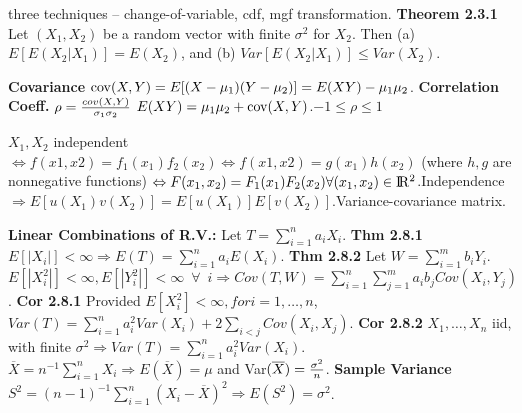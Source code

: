 {{}%
%
%
%
%
%
three techniques -- change-of-variable, cdf, mgf transformation.
%
%
{\bf Theorem 2.3.1} Let $(X_1,X_2)$ be a random vector with finite $\sigma^2$ for $X_2$. Then (a) $E[E(X_2|X_1)]=E(X_2)$, and (b) $Var[E(X_2|X_1)] \leq Var(X_2)$.\quad

{\bf Covariance} ${\rm cov}(X,Y) = E[(X-\mu_1)(Y-\mu_2)] = E(XY) - \mu_1\mu_2$.\quad
{\bf Correlation Coeff.} $\rho = {cov(X,Y)\over \sigma_1\sigma_2}$\quad
$E(XY) = \mu_1\mu_2 + {\rm cov}(X,Y)$.\quad $-1 \leq \rho \leq 1$

$X_1,X_2$ independent $\Leftrightarrow f(x1,x2) = f_1(x_1)f_2(x_2) \Leftrightarrow f(x1,x2) = g(x_1)h(x_2)$ (where $h,g$ are nonnegative functions) $\Leftrightarrow F(x_1,x_2)=F_1(x_1)F_2(x_2) \forall (x_1,x_2) \in \rm I\!R^2$.\quad Independence $\Rightarrow E[u(X_1)v(X_2)] = E[u(X_1)]E[v(X_2)]$.\quad Variance-covariance matrix.

{\bf Linear Combinations of R.V.:} Let $T = \sum_{i=1}^na_iX_i$. {\bf Thm 2.8.1}  $E[|X_i|] < \infty \Longrightarrow E(T) = \sum_{i=1}^na_iE(X_i)$.%
{\bf Thm 2.8.2} Let $W = \sum_{i=1}^mb_iY_i$. $E[|X_i^2|] < \infty, E[|Y_i^2|] < \infty\enspace \forall\enspace i \Longrightarrow Cov(T,W) = \sum_{i=1}^n\sum_{j=1}^ma_ib_jCov(X_i,Y_j)$.
{\bf Cor 2.8.1} Provided $E[X_i^2] < \infty, for i = 1,\dots,n$, $Var(T)=\sum_{i=1}^n{a_i^2Var(X_i)+2\sum_{i<j}Cov(X_i,X_j)}$.\quad
{\bf Cor 2.8.2} $X_1,\dots,X_n$ iid, with finite $\sigma^2 \Longrightarrow Var(T) = \sum_{i=1}^na_i^2Var(X_i)$.\quad
${\overline X} = n^{-1}\sum_{i=1}^nX_i \Rightarrow E(\overline X) = \mu$ and Var$({\overline X}) = {\sigma^2 \over n}$.\quad
{\bf Sample Variance} $S^2 = (n-1)^{-1}\sum_{i=1}^n(X_i-{\overline X})^2 \Rightarrow E(S^2)=\sigma^2$.\quad

}
